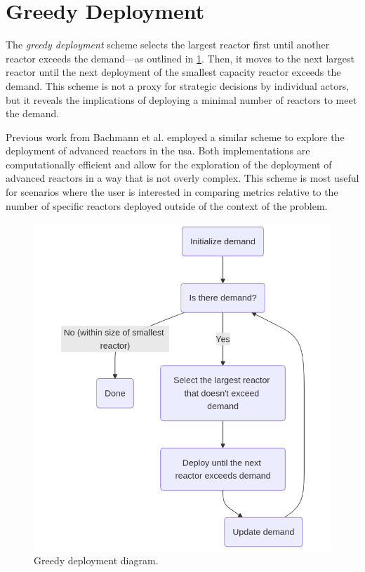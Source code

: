 \section{Greedy Deployment}
\label{sec:greedy_deployment}

The \textit{greedy deployment} scheme selects the largest reactor first until another
reactor exceeds the demand---as outlined in \ref{fig:greedy_diagram}. Then, it moves to the next largest reactor until the next deployment of the smallest capacity reactor exceeds the demand. This scheme is not a proxy for strategic decisions by individual actors, but it reveals the implications of deploying a minimal number of reactors to meet the demand.

Previous work from Bachmann et al. \cite{bachmann_enrichment_2021} employed a similar scheme to explore the deployment of advanced reactors in the \gls{usa}. Both implementations are computationally efficient and allow for the exploration of the deployment of advanced reactors in a way that is not overly complex. This scheme is most useful for scenarios where the user is interested in comparing metrics relative to the number of specific reactors deployed outside of the context of the problem.

\begin{figure}[H]
    \centering
    \includegraphics[scale=0.3]{images/schemes/greedy_diagram.png}
    \caption{Greedy deployment diagram.}
    \label{fig:greedy_diagram}
\end{figure}

